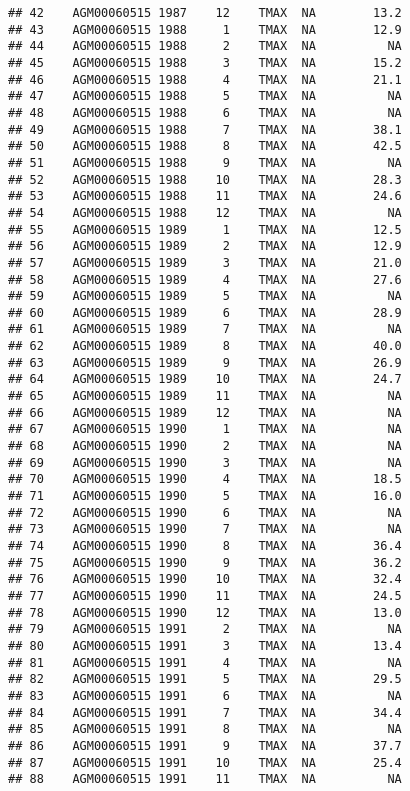 \documentclass{article}\usepackage[]{graphicx}\usepackage[]{color}
\makeatletter
\newenvironment{kframe}{%
 \def\at@end@of@kframe{}%
 \ifinner\ifhmode%
  \def\at@end@of@kframe{\end{minipage}}%
  \begin{minipage}{\columnwidth}%
 \fi\fi%
 \def\FrameCommand##1{\hskip\@totalleftmargin \hskip-\fboxsep
 \colorbox{shadecolor}{##1}\hskip-\fboxsep
     \hskip-\linewidth \hskip-\@totalleftmargin \hskip\columnwidth}%
 \MakeFramed {\advance\hsize-\width
   \@totalleftmargin\z@ \linewidth\hsize
   \@setminipage}}%
 {\par\unskip\endMakeFramed%
 \at@end@of@kframe}
\newenvironment{knitrout}{}{} %
\makeatother
\begin{document}
\begin{knitrout}
\begin{kframe}
\begin{verbatim}
## 42    AGM00060515 1987    12    TMAX  NA        13.2
## 43    AGM00060515 1988     1    TMAX  NA        12.9
## 44    AGM00060515 1988     2    TMAX  NA          NA
## 45    AGM00060515 1988     3    TMAX  NA        15.2
## 46    AGM00060515 1988     4    TMAX  NA        21.1
## 47    AGM00060515 1988     5    TMAX  NA          NA
## 48    AGM00060515 1988     6    TMAX  NA          NA
## 49    AGM00060515 1988     7    TMAX  NA        38.1
## 50    AGM00060515 1988     8    TMAX  NA        42.5
## 51    AGM00060515 1988     9    TMAX  NA          NA
## 52    AGM00060515 1988    10    TMAX  NA        28.3
## 53    AGM00060515 1988    11    TMAX  NA        24.6
## 54    AGM00060515 1988    12    TMAX  NA          NA
## 55    AGM00060515 1989     1    TMAX  NA        12.5
## 56    AGM00060515 1989     2    TMAX  NA        12.9
## 57    AGM00060515 1989     3    TMAX  NA        21.0
## 58    AGM00060515 1989     4    TMAX  NA        27.6
## 59    AGM00060515 1989     5    TMAX  NA          NA
## 60    AGM00060515 1989     6    TMAX  NA        28.9
## 61    AGM00060515 1989     7    TMAX  NA          NA
## 62    AGM00060515 1989     8    TMAX  NA        40.0
## 63    AGM00060515 1989     9    TMAX  NA        26.9
## 64    AGM00060515 1989    10    TMAX  NA        24.7
## 65    AGM00060515 1989    11    TMAX  NA          NA
## 66    AGM00060515 1989    12    TMAX  NA          NA
## 67    AGM00060515 1990     1    TMAX  NA          NA
## 68    AGM00060515 1990     2    TMAX  NA          NA
## 69    AGM00060515 1990     3    TMAX  NA          NA
## 70    AGM00060515 1990     4    TMAX  NA        18.5
## 71    AGM00060515 1990     5    TMAX  NA        16.0
## 72    AGM00060515 1990     6    TMAX  NA          NA
## 73    AGM00060515 1990     7    TMAX  NA          NA
## 74    AGM00060515 1990     8    TMAX  NA        36.4
## 75    AGM00060515 1990     9    TMAX  NA        36.2
## 76    AGM00060515 1990    10    TMAX  NA        32.4
## 77    AGM00060515 1990    11    TMAX  NA        24.5
## 78    AGM00060515 1990    12    TMAX  NA        13.0
## 79    AGM00060515 1991     2    TMAX  NA          NA
## 80    AGM00060515 1991     3    TMAX  NA        13.4
## 81    AGM00060515 1991     4    TMAX  NA          NA
## 82    AGM00060515 1991     5    TMAX  NA        29.5
## 83    AGM00060515 1991     6    TMAX  NA          NA
## 84    AGM00060515 1991     7    TMAX  NA        34.4
## 85    AGM00060515 1991     8    TMAX  NA          NA
## 86    AGM00060515 1991     9    TMAX  NA        37.7
## 87    AGM00060515 1991    10    TMAX  NA        25.4
## 88    AGM00060515 1991    11    TMAX  NA          NA

\end{verbatim}
\end{kframe}
\end{knitrout}
\end{document}
